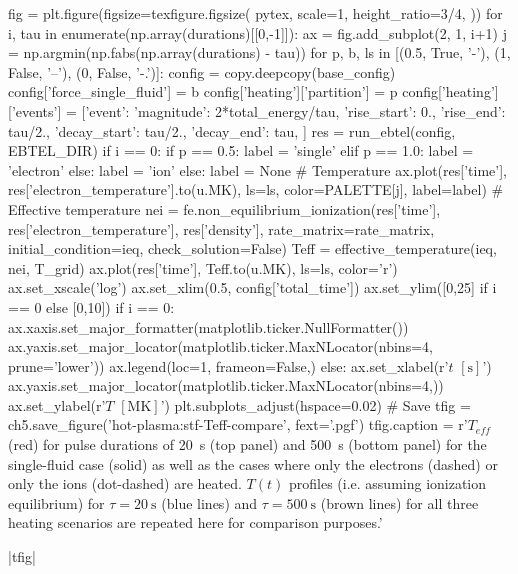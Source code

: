 \begin{pycode}[chapter5]
fig = plt.figure(figsize=texfigure.figsize(
    pytex,
    scale=1,
    height_ratio=3/4,
))
for i, tau in enumerate(np.array(durations)[[0,-1]]):
    ax = fig.add_subplot(2, 1, i+1)
    j = np.argmin(np.fabs(np.array(durations) - tau))
    for p, b, ls in [(0.5, True, '-'), (1, False, '--'), (0, False, '-.')]:
        config = copy.deepcopy(base_config)
        config['force_single_fluid'] = b
        config['heating']['partition'] = p
        config['heating']['events'] = [{'event': {
            'magnitude': 2*total_energy/tau,
            'rise_start': 0.,
            'rise_end': tau/2.,
            'decay_start': tau/2.,
            'decay_end': tau,
        }}]
        res = run_ebtel(config, EBTEL_DIR)
        if i == 0:
            if p == 0.5:
                label = 'single'
            elif p == 1.0:
                label = 'electron'
            else:
                label = 'ion'
        else:
            label = None
        # Temperature
        ax.plot(res['time'], res['electron_temperature'].to(u.MK),
                ls=ls, color=PALETTE[j], label=label)
        # Effective temperature
        nei = fe.non_equilibrium_ionization(res['time'], res['electron_temperature'], res['density'],
                                            rate_matrix=rate_matrix, initial_condition=ieq,
                                            check_solution=False)
        Teff = effective_temperature(ieq, nei, T_grid)
        ax.plot(res['time'], Teff.to(u.MK), ls=ls, color='r')
    ax.set_xscale('log')
    ax.set_xlim(0.5, config['total_time'])
    ax.set_ylim([0,25] if i == 0 else [0,10])
    if i == 0:
        ax.xaxis.set_major_formatter(matplotlib.ticker.NullFormatter())
        ax.yaxis.set_major_locator(matplotlib.ticker.MaxNLocator(nbins=4, prune='lower'))
        ax.legend(loc=1, frameon=False,)
    else:
        ax.set_xlabel(r'$t$ $[\si{\second}]$')
        ax.yaxis.set_major_locator(matplotlib.ticker.MaxNLocator(nbins=4,))
    ax.set_ylabel(r'$T$ $[\si{\mega\kelvin}]$')
plt.subplots_adjust(hspace=0.02)
# Save
tfig = ch5.save_figure('hot-plasma:stf-Teff-compare', fext='.pgf')
tfig.caption = r'$T_{eff}$ (red) for pulse durations of \SI{20}{\second} (top panel) and \SI{500}{\second} (bottom panel) for the single-fluid case (solid) as well as the cases where only the electrons (dashed) or only the ions (dot-dashed) are heated. $T(t)$ profiles (i.e. assuming ionization equilibrium) for $\tau=\SI{20}{\second}$ (blue lines) and $\tau=\SI{500}{\second}$ (brown lines) for all three heating scenarios are repeated here for comparison purposes.'
\end{pycode}
\py[chapter5]|tfig|

